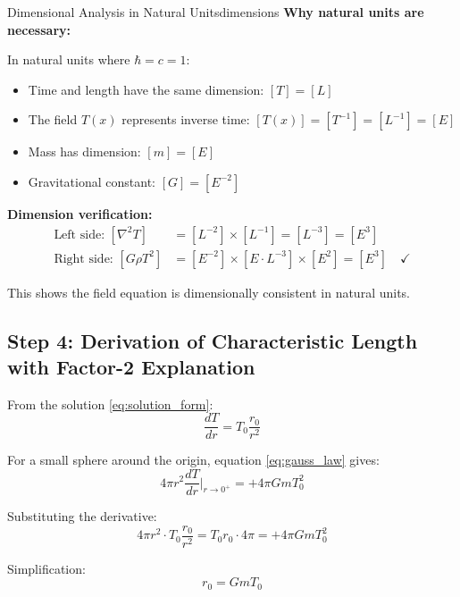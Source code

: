 \documentclass[12pt,a4paper]{article}
\begin{document}
	\begin{important}{Dimensional Analysis in Natural Units}{dimensions}
		\textbf{Why natural units are necessary:}
		
		In natural units where $\hbar = c = 1$:
		\begin{itemize}
			\item Time and length have the same dimension: $[T] = [L]$
			\item The field $T(x)$ represents inverse time: $[T(x)] = [T^{-1}] = [L^{-1}] = [E]$
			\item Mass has dimension: $[m] = [E]$
			\item Gravitational constant: $[G] = [E^{-2}]$
		\end{itemize}
		
		\textbf{Dimension verification:}
		\begin{align}
			\text{Left side: } [\nabla^2 T] &= [L^{-2}] \times [L^{-1}] = [L^{-3}] = [E^3] \\
			\text{Right side: } [G \rho T^2] &= [E^{-2}] \times [E \cdot L^{-3}] \times [E^2] = [E^3] \quad \checkmark
		\end{align}
		
		This shows the field equation is dimensionally consistent in natural units.
	\end{important}
	
	\subsection{Step 4: Derivation of Characteristic Length with Factor-2 Explanation}
	
	From the solution \eqref{eq:solution_form}:
	\begin{equation}
		\frac{dT}{dr} = T_0 \frac{r_0}{r^2}
	\end{equation}
	
	For a small sphere around the origin, equation \eqref{eq:gauss_law} gives:
	\begin{equation}
		4\pi r^2 \frac{dT}{dr}\bigg|_{r \to 0^+} = +4\pi G m T_0^2
	\end{equation}
	
	Substituting the derivative:
	\begin{equation}
		4\pi r^2 \cdot T_0 \frac{r_0}{r^2} = T_0 r_0 \cdot 4\pi = +4\pi G m T_0^2
	\end{equation}
	
	Simplification:
	\begin{equation}
		r_0 = G m T_0
	\end{equation}
	
\end{document}
